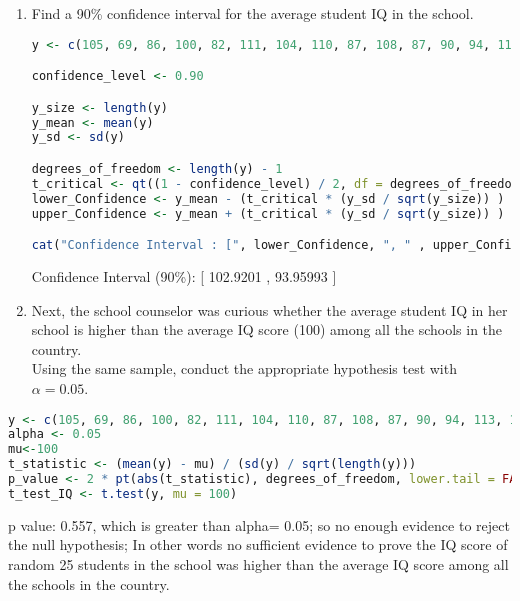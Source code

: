 \documentclass[12pt,letterpaper]{article}
\begin{document}
\begin{enumerate}
	\item Find a 90\% confidence interval for the average student IQ in the school.\\

\begin{lstlisting}[language=R] 
y <- c(105, 69, 86, 100, 82, 111, 104, 110, 87, 108, 87, 90, 94, 113, 112, 98, 80, 97, 95, 111, 114, 89, 95, 126, 98)

confidence_level <- 0.90

y_size <- length(y)
y_mean <- mean(y)
y_sd <- sd(y)

degrees_of_freedom <- length(y) - 1
t_critical <- qt((1 - confidence_level) / 2, df = degrees_of_freedom)
lower_Confidence <- y_mean - (t_critical * (y_sd / sqrt(y_size)) )
upper_Confidence <- y_mean + (t_critical * (y_sd / sqrt(y_size)) )

cat("Confidence Interval : [", lower_Confidence, ", " , upper_Confidence, "]\n")
\end{lstlisting} 

\noindent Confidence Interval (90\%): [ 102.9201 ,  93.95993 ]

\item Next, the school counselor was curious  whether  the average student IQ in her school is higher than the average IQ score (100) among all the schools in the country.\\ 


	\noindent Using the same sample, conduct the appropriate hypothesis test with $\alpha=0.05$.
\end{enumerate}
\begin{lstlisting}[language=R] 
y <- c(105, 69, 86, 100, 82, 111, 104, 110, 87, 108, 87, 90, 94, 113, 112, 98, 80, 97, 95, 111, 114, 89, 95, 126, 98)
alpha <- 0.05
mu<-100
t_statistic <- (mean(y) - mu) / (sd(y) / sqrt(length(y)))
p_value <- 2 * pt(abs(t_statistic), degrees_of_freedom, lower.tail = FALSE)
t_test_IQ <- t.test(y, mu = 100)  
\end{lstlisting} 

\noindent p value: 0.557, which is greater than alpha= 0.05; 
so no enough evidence to reject the null hypothesis; In other words no sufficient evidence to prove the IQ score of random 25 students in the school was higher than the average IQ score among all the schools in the country. \\
\vspace{.5cm}

\newpage
\end{document}
